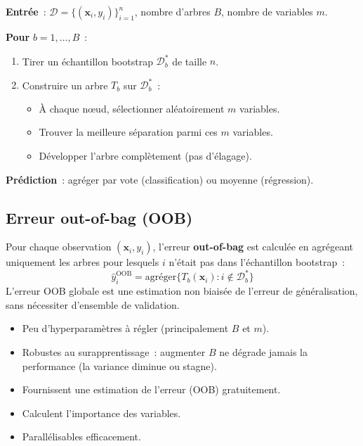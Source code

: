 \begin{algorithme}[title=\textbf{Algorithme Random Forest}]
\textbf{Entr\'ee}~: $\mathcal{D} = \{(\bm{x}_i, y_i)\}_{i=1}^n$, nombre
d'arbres $B$, nombre de variables $m$.

\textbf{Pour} $b = 1, \ldots, B$~:
\begin{enumerate}
  \item Tirer un \'echantillon bootstrap $\mathcal{D}_b^*$ de taille $n$.
  \item Construire un arbre $T_b$ sur $\mathcal{D}_b^*$~:
    \begin{itemize}
      \item \`A chaque n\oe{}ud, s\'electionner al\'eatoirement $m$ variables.
      \item Trouver la meilleure s\'eparation parmi ces $m$ variables.
      \item D\'evelopper l'arbre compl\`etement (pas d'\'elagage).
    \end{itemize}
\end{enumerate}
\textbf{Pr\'ediction}~: agr\'eger par vote (classification) ou moyenne
(r\'egression).
\end{algorithme}

\subsection{Erreur out-of-bag (OOB)}

\begin{definition}
Pour chaque observation $(\bm{x}_i, y_i)$, l'erreur \textbf{out-of-bag} est
calcul\'ee en agr\'egeant uniquement les arbres pour lesquels $i$ n'\'etait
pas dans l'\'echantillon bootstrap~:
\begin{equation}
  \hat{y}_i^{\text{OOB}} = \text{agr\'eger}\{T_b(\bm{x}_i) :
    i \notin \mathcal{D}_b^*\}
\end{equation}
L'erreur OOB globale est une estimation non biais\'ee de l'erreur de
g\'en\'eralisation, sans n\'ecessiter d'ensemble de validation.
\end{definition}

\begin{bonnepratique}[title=\textbf{Avantages des for\^ets al\'eatoires}]
\begin{itemize}
  \item Peu d'hyperparam\`etres \`a r\'egler (principalement $B$ et $m$).
  \item Robustes au surapprentissage~: augmenter $B$ ne d\'egrade jamais
    la performance (la variance diminue ou stagne).
  \item Fournissent une estimation de l'erreur (OOB) gratuitement.
  \item Calculent l'importance des variables.
  \item Parall\'elisables efficacement.
\end{itemize}
\end{bonnepratique}

